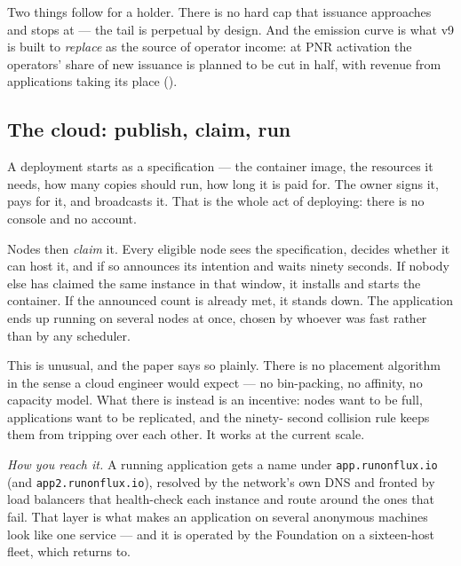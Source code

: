 Two things follow for a holder. There is no hard cap that issuance approaches and stops at --- the
tail is perpetual by design. And the emission curve is what v9 is built to \emph{replace} as the
source of operator income: at PNR activation the operators' share of new issuance is planned to be
cut in half, with revenue from applications taking its place ().

\subsection{The cloud: publish, claim, run}

A deployment starts as a specification --- the container image, the resources it needs, how many
copies should run, how long it is paid for. The owner signs it, pays for it, and broadcasts it.
That is the whole act of deploying: there is no console and no account.

Nodes then \emph{claim} it. Every eligible node sees the specification, decides whether it can
host it, and if so announces its intention and waits ninety seconds. If nobody else has claimed the
same instance in that window, it installs and starts the container. If the announced count is
already met, it stands down. The application ends up running on several nodes at once, chosen by
whoever was fast rather than by any scheduler.

This is unusual, and the paper says so plainly. There is no placement algorithm in the sense a
cloud engineer would expect --- no bin-packing, no affinity, no capacity model. What there is
instead is an incentive: nodes want to be full, applications want to be replicated, and the ninety-
second collision rule keeps them from tripping over each other. It works at the current scale. 

\emph{How you reach it.} A running application gets a name under \texttt{app.runonflux.io} (and
\texttt{app2.runonflux.io}), resolved by the network's own DNS and fronted by load balancers that
health-check each instance and route around the ones that fail. That layer is what makes an
application on several anonymous machines look like one service --- and it is operated by the
Foundation on a sixteen-host fleet, which  returns to.

